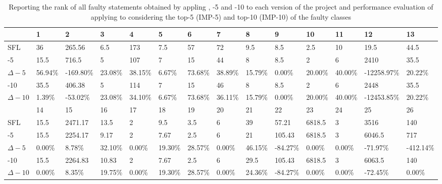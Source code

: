 \documentclass{article}
\begin{document}
\begin{table}[h]
	\small
	\setlength{\tabcolsep}{3pt}
	\begin{tabular}{@{}p{1.6cm}p{1cm}p{1.3cm}p{1cm}p{1cm}p{0.8cm}p{1cm}p{1cm}p{1cm}p{1.1cm}p{1cm}p{1cm}p{1.6cm}p{1.3cm}@{}}
	\toprule
		   & 1    & 2   & 3  & 4   & 5           & 6   & 7  & 8    & 9            & 10     & 11 & 12      & 13   \\ \midrule
	SFL    & 36   & 265.56    & 6.5         & 173 & 7.5         & 57  & 72 & 9.5  & 8.5          & 2.5    & 10 & 19.5    & 44.5 \\
	\comb{}-5   & 15.5 & 716.5       & 5           & 107 & 7           & 15  & 44 & 8    & 8.5          & 2      & 6  & 2410    & 35.5 \\
	$\Delta-5$  & 56.94\% & -169.80\%   & 23.08\%     & 38.15\% & 6.67\%      & 73.68\% & 38.89\% & 15.79\% & 0.00\%      & 20.00\% & 40.00\% & -12258.97\% & 20.22\%   \\
	\comb{}-10  & 35.5 & 406.38     & 5           & 114 & 7           & 15  & 46 & 8    & 8.5          & 2      & 6  & 2448    & 35.5 \\
	$\Delta-10$ & 1.39\%  & -53.02\%    & 23.08\%     & 34.10\% & 6.67\%      & 73.68\% & 36.11\% & 15.79\% & 0.00\%      & 20.00\% & 40.00\% & -12453.85\% & 20.22\%   \\\midrule
	& 14   & 15          & 16          & 17  & 18          & 19  & 20 & 21   & 22           & 23     & 24 & 25      & 26   \\\midrule
	SFL    & 15.5 & 2471.17 & 13.5        & 2   & 9.5         & 3.5 & 6  & 39   & 57.21  & 6818.5 & 3  & 3516    & 140  \\
	\comb{}-5   & 15.5 & 2254.17 & 9.17 & 2   & 7.67 & 2.5 & 6  & 21   & 105.43  & 6818.5 & 3  & 6046.5  & 717  \\
	$\Delta-5$  & 0.00\%  & 8.78\%      & 32.10\%     & 0.00\%  & 19.30\%     & 28.57\% & 0.00\%  & 46.15\% & -84.27\%    & 0.00\%  & 0.00\%  & -71.97\%    & -412.14\% \\
	\comb{}-10  & 15.5 & 2264.83 & 10.83 & 2   & 7.67 & 2.5 & 6  & 29.5 & 105.43  & 6818.5 & 3  & 6063.5  & 140  \\
	$\Delta-10$ & 0.00\%  & 8.35\%      & 19.75\%     & 0.00\%  & 19.30\%     & 28.57\% & 0.00\%  & 24.36\% & -84.27\%    & 0.00\%  & 0.00\%  & -72.45\%    & 0.00\% \\
	\bottomrule
	\end{tabular}
	\caption {Reporting the rank of all faulty statements obtained by appling \sfl{}, \comb{}-5 and \comb{}-10 to each version of the \chart{} project and performance evaluation of applying \ds{} to \sfl{} considering the top-5 (IMP-5) and top-10 (IMP-10) of the faulty classes}
	\label{table:performance}
\end{table}
\normalsize
\end{document}

